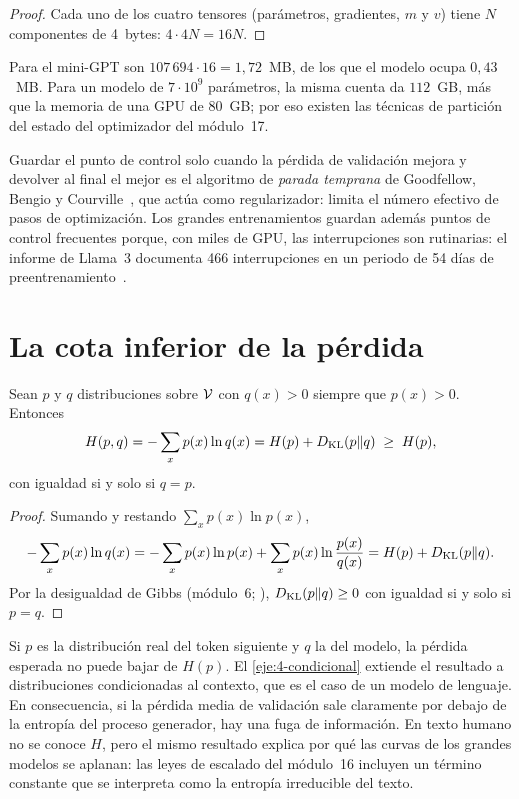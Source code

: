 \begin{proof}
Cada uno de los cuatro tensores (parámetros, gradientes, $m$ y $v$) tiene $N$ componentes de 4~bytes: $4\cdot 4N=16N$.
\end{proof}

Para el mini-GPT son $107\,694\cdot 16=1{,}72$~MB, de los que el modelo ocupa $0{,}43$~MB. Para un modelo de $7\cdot 10^{9}$ parámetros, la misma cuenta da $112$~GB, más que la memoria de una GPU de $80$~GB; por eso existen las técnicas de partición del estado del optimizador del módulo~17.

\begin{observacion}\label{obs:parada}
Guardar el punto de control solo cuando la pérdida de validación mejora y devolver al final el mejor es el algoritmo de \emph{parada temprana} de Goodfellow, Bengio y Courville~\cite[§7.8]{gbc}, que actúa como regularizador: limita el número efectivo de pasos de optimización. Los grandes entrenamientos guardan además puntos de control frecuentes porque, con miles de GPU, las interrupciones son rutinarias: el informe de Llama~3 documenta 466 interrupciones en un periodo de 54 días de preentrenamiento~\cite[§3.3.4]{llama3}.
\end{observacion}

\section{La cota inferior de la pérdida}

\begin{teorema}\label{teo:cota}
Sean $p$ y $q$ distribuciones sobre $\mathcal{V}$ con $q(x)>0$ siempre que $p(x)>0$. Entonces
\[
H(p,q)=-\sum_{x}p(x)\ln q(x)=H(p)+D_{\mathrm{KL}}(p\Vert q)\;\ge\;H(p),
\]
con igualdad si y solo si $q=p$.
\end{teorema}

\begin{proof}
Sumando y restando $\sum_x p(x)\ln p(x)$,
\[
-\sum_x p(x)\ln q(x)=-\sum_x p(x)\ln p(x)+\sum_x p(x)\ln\frac{p(x)}{q(x)}=H(p)+D_{\mathrm{KL}}(p\Vert q).
\]
Por la desigualdad de Gibbs (módulo~6; \cite[teorema~2.6.3]{ct}), $D_{\mathrm{KL}}(p\Vert q)\ge 0$ con igualdad si y solo si $p=q$.
\end{proof}

Si $p$ es la distribución real del token siguiente y $q$ la del modelo, la pérdida esperada no puede bajar de $H(p)$. El \cref{eje:4-condicional} extiende el resultado a distribuciones condicionadas al contexto, que es el caso de un modelo de lenguaje. En consecuencia, si la pérdida media de validación sale claramente por debajo de la entropía del proceso generador, hay una fuga de información. En texto humano no se conoce $H$, pero el mismo resultado explica por qué las curvas de los grandes modelos se aplanan: las leyes de escalado del módulo~16 incluyen un término constante que se interpreta como la entropía irreducible del texto.

